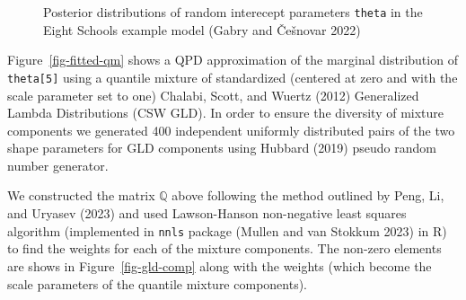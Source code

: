 \documentclass[
]{interact}
\begin{document}
\begin{figure}


\caption{\label{fig-school-thetas}Posterior distributions of random
interecept parameters \texttt{theta} in the Eight Schools example model
(Gabry and Češnovar 2022)}

\end{figure}%

Figure~\ref{fig-fitted-qm} shows a QPD approximation of the marginal
distribution of \texttt{theta{[}5{]}} using a quantile mixture of
standardized (centered at zero and with the scale parameter set to one)
Chalabi, Scott, and Wuertz (2012) Generalized Lambda Distributions (CSW
GLD). In order to ensure the diversity of mixture components we
generated 400 independent uniformly distributed pairs of the two shape
parameters for GLD components using Hubbard (2019) pseudo random number
generator.

We constructed the matrix \(\mathbb Q\) above following the method
outlined by Peng, Li, and Uryasev (2023) and used Lawson-Hanson
non-negative least squares algorithm (implemented in \texttt{nnls}
package (Mullen and van Stokkum 2023) in R) to find the weights for each
of the mixture components. The non-zero elements are shows in
Figure~\ref{fig-gld-comp} along with the weights (which become the scale
parameters of the quantile mixture components).
\end{document}
